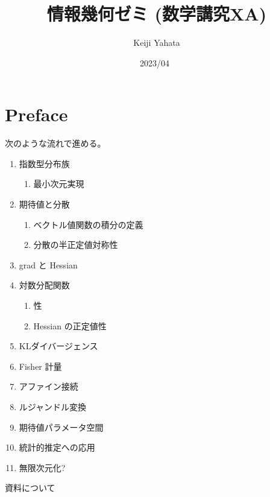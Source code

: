 \documentclass[report, notitlepage]{jlreq}
\title{情報幾何ゼミ (数学講究XA)}
\author{Keiji Yahata}
\date{2023/04~}
\begin{document}
\maketitle

\chapter*{Preface}

次のような流れで進める。

\begin{enumerate}
    \item 指数型分布族
        \begin{enumerate}
            \item 最小次元実現
        \end{enumerate}
    \item 期待値と分散
        \begin{enumerate}
            \item ベクトル値関数の積分の定義
            \item 分散の半正定値対称性
        \end{enumerate}
    \item grad と Hessian
    \item 対数分配関数
        \begin{enumerate}
            \item \smooth 性
            \item Hessian の正定値性
        \end{enumerate}
    \item KLダイバージェンス
    \item Fisher 計量
    \item アファイン接続
    \item ルジャンドル変換
    \item 期待値パラメータ空間
    \item 統計的推定への応用
    \item 無限次元化?
\end{enumerate}

資料について
\end{document}
